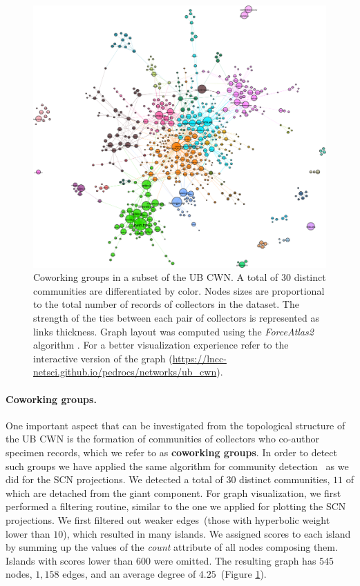 \begin{figure}[h!]
  	\centering
    \includegraphics[width=\linewidth]{figures/casestudy_ub/cwn_communities.pdf}
    \caption[Coworking groups in the UB CWN.]{ Coworking groups in a subset of the UB CWN. A total of $30$ distinct communities are differentiated by color. Nodes sizes  are proportional to the total number of records of collectors in the dataset. The strength of the ties between each pair of collectors is represented as links thickness. Graph layout was computed using the \textit{ForceAtlas2} algorithm \cite{Jacomy2014}. For a better visualization experience refer to the interactive version of the graph (\url{https://lncc-netsci.github.io/pedrocs/networks/ub_cwn}).}
    \label{fig:ub_cwn_communities}
\end{figure}

\paragraph{Coworking groups.}

One important aspect that can be investigated from the topological structure of the UB CWN is the formation of communities of collectors who co-author specimen records, which we refer to as \textbf{coworking groups}. 
%
In order to detect such groups we have applied the same algorithm for community detection~\cite{Blondel2008} as we did for the SCN projections.
%
We detected a total of $30$ distinct communities, $11$ of which are detached from the giant component.
%
For graph visualization, we first performed a filtering routine, similar to the one we applied for plotting the SCN projections. 
We first filtered out weaker edges~(those with hyperbolic weight lower than $10$), which resulted in many islands. We assigned scores to each island by summing up the values of the \textit{count} attribute of all nodes composing them. 
Islands with scores lower than $600$ were omitted.
The resulting graph has $545$ nodes, $1,158$ edges, and an average degree of $4.25$~(Figure \ref{fig:ub_cwn_communities}).

